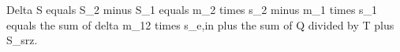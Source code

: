Delta S equals S_2 minus S_1 equals m_2 times s_2 minus m_1 times s_1 equals the sum of delta m_12 times s_e,in plus the sum of Q divided by T plus S_srz.